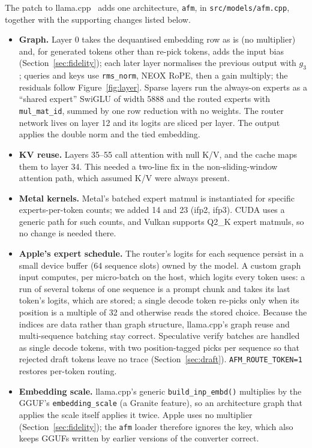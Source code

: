 \documentclass[11pt,reqno]{amsart}
\newcommand{\code}[1]{\texttt{#1}}
\theoremstyle{definition}
\begin{document}
The patch to llama.cpp~\cite{llamacpp} adds one architecture, \code{afm}, in \code{src/models/afm.cpp}, together with the supporting changes listed below.
\begin{itemize}
\item \textbf{Graph.} Layer 0 takes the dequantised embedding row as is (no multiplier) and, for generated tokens other than re-pick tokens, adds the input bias (Section~\ref{sec:fidelity}); each later layer normalises the previous output with $g_3$; queries and keys use \code{rms\_norm}, NEOX RoPE, then a gain multiply; the residuals follow Figure~\ref{fig:layer}. Sparse layers run the always-on experts as a ``shared expert'' SwiGLU of width 5888 and the routed experts with \code{mul\_mat\_id}, summed by one row reduction with no weights. The router network lives on layer 12 and its logits are sliced per layer. The output applies the double norm and the tied embedding.
\item \textbf{KV reuse.} Layers 35--55 call attention with null K/V, and the cache maps them to layer 34. This needed a two-line fix in the non-sliding-window attention path, which assumed K/V were always present.
\item \textbf{Metal kernels.} Metal's batched expert matmul is instantiated for specific experts-per-token counts; we added 14 and 23 (ifp2, ifp3). CUDA uses a generic path for such counts, and Vulkan supports Q2\_K expert matmuls, so no change is needed there.
\item \textbf{Apple's expert schedule.} The router's logits for each sequence persist in a small device buffer (64 sequence slots) owned by the model. A custom graph input computes, per micro-batch on the host, which logits every token uses: a run of several tokens of one sequence is a prompt chunk and takes its last token's logits, which are stored; a single decode token re-picks only when its position is a multiple of 32 and otherwise reads the stored choice. Because the indices are data rather than graph structure, llama.cpp's graph reuse and multi-sequence batching stay correct. Speculative verify batches are handled as single decode tokens, with two position-tagged picks per sequence so that rejected draft tokens leave no trace (Section~\ref{sec:draft}). \code{AFM\_ROUTE\_TOKEN=1} restores per-token routing.
\item \textbf{Embedding scale.} llama.cpp's generic \code{build\_inp\_embd()} multiplies by the GGUF's \code{embedding\_scale} (a Granite feature), so an architecture graph that applies the scale itself applies it twice. Apple uses no multiplier (Section~\ref{sec:fidelity}); the \code{afm} loader therefore ignores the key, which also keeps GGUFs written by earlier versions of the converter correct.

\end{itemize}
\end{document}
